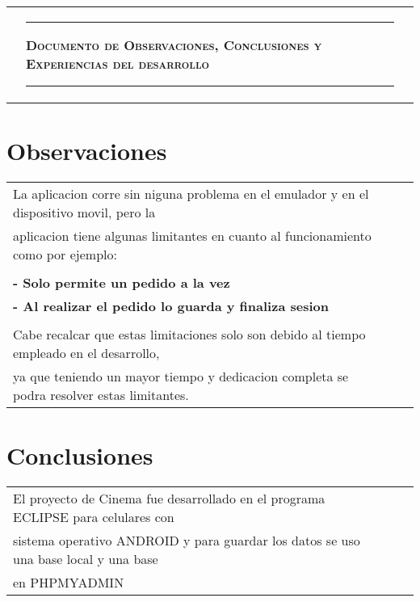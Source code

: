 \documentclass[letterpaper,11pt]{article}
\newcommand{\PreserveBackslash}[1]{\let\temp=\\#1\let\\=\temp}
\let\PBS=\PreserveBackslash
\begin{document}
\begin{tabular}{c >{\PBS\centering\vspace{-2,7cm}}p{} c}
  & \rule{11,5cm}{0.7pt} \newline \newline
 \textbf{\textsc{{\Large Documento de Observaciones, Conclusiones y Experiencias del desarrollo} }}\newline
 \rule{11,5cm}{0.7pt} & \newline
\end{tabular} 




\section{Observaciones}

\begin{tabular}{lll}

La aplicacion corre sin niguna problema en el emulador y en el dispositivo movil, pero la \\
aplicacion tiene algunas limitantes en cuanto al funcionamiento como por ejemplo:\\\\
\textbf{- Solo permite un pedido a la vez} \\
\textbf{- Al realizar el pedido lo guarda y finaliza sesion} \\\\
Cabe recalcar que estas limitaciones solo son debido al tiempo empleado en el desarrollo, \\
ya que teniendo un mayor tiempo y dedicacion completa se podra resolver estas limitantes.\\
\end{tabular}

\section{Conclusiones}

\begin{tabular}{lll}

 El proyecto de Cinema fue desarrollado en el programa ECLIPSE para celulares con \\
sistema operativo ANDROID y para guardar los datos se uso una base local y una base\\
en PHPMYADMIN \\


\end{tabular}
\end{document}
